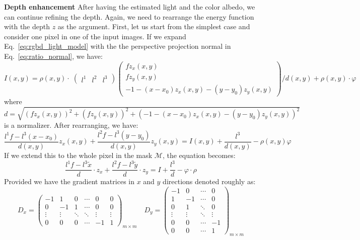 \textbf{Depth enhancement}
After having the estimated light and the color albedo, we can continue refining the depth.
Again, we need to rearrange the energy function with the depth $z$ as the argument.
First, let us start from the simplest case and consider one pixel in one of the input images.
If we expand Eq.~\ref{eq:rgbd_light_model} with the the perspective projection normal in Eq.~\ref{eq:ratio_normal}, we have:
\begin{equation}
    I(x,y) = \rho(x,y) \cdot \; 
    \begin{pmatrix}
        l^1 & l^2 & l^3 
    \end{pmatrix}
     \begin{pmatrix}
         fz_x(x,y)\\
         fz_y(x,y)\\
         -1 - (x - x_0)z_x(x,y) - (y - y_0)z_y(x,y)
     \end{pmatrix}/ d(x,y)
     + \rho(x,y) \cdot \varphi   
\end{equation}
where $d = \sqrt{(fz_x(x,y))^2 + (fz_y(x,y))^2 + (-1 - (x - x_0)z_x(x,y) - (y - y_0)z_y(x,y))^2}$ is a normalizer.
After rearranging, we have:
\begin{equation}
    \frac{l^1f - l^3(x-x_0)}{d(x,y)}z_x(x,y) + \frac{l^2f - l^3(y-y_0)}{d(x,y)}z_y(x,y) = I(x,y) + \frac{l^3}{d(x,y)} - \rho(x,y)\varphi
\end{equation}
If we extend this to the whole pixel in the mask $\mathcal{M}$, the equation becomes:
\begin{equation}\label{eq:robust_depth1}
    \frac{l^1f - l^3\tilde{x}}{d} \cdot z_x + \frac{l^2f - l^3\tilde{y}}{d} \cdot z_y = I + \frac{l^3}{d} - \varphi \cdot \rho
\end{equation}
Provided we have the gradient matrices in $x$ and $y$ directions denoted roughly as:
\begin{equation}
D_x = \begin{pmatrix}
-1 & 1 & 0 &\cdots & 0 & 0 \\
0 & -1 & 1 &\cdots &  0 & 0 \\
\vdots & \vdots & \ddots & \ddots & \vdots & \vdots \\
0 & 0 & 0 & \cdots & -1 & 1
\end{pmatrix}_{m\times m}
\quad
D_y = \begin{pmatrix}
-1 & 0 & \cdots & 0 \\
1 & -1 & \cdots & 0 \\
0 & 1 & \ddots & 0 \\
\vdots & \vdots & \ddots & \vdots\\
0 & 0 & \cdots & -1\\
0 & 0 & \cdots & 1
\end{pmatrix}_{m\times m}
\end{equation}
